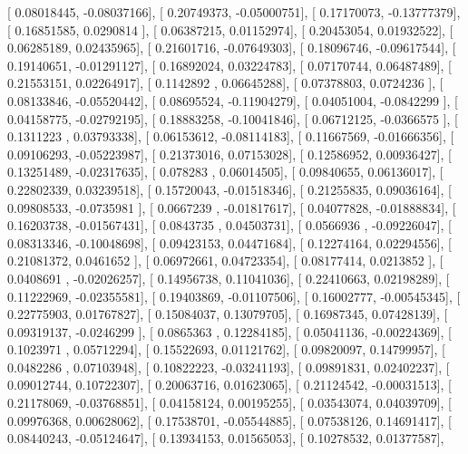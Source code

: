 \documentclass{article}
\begin{document}
       [ 0.08018445, -0.08037166],
       [ 0.20749373, -0.05000751],
       [ 0.17170073, -0.13777379],
       [ 0.16851585,  0.0290814 ],
       [ 0.06387215,  0.01152974],
       [ 0.20453054,  0.01932522],
       [ 0.06285189,  0.02435965],
       [ 0.21601716, -0.07649303],
       [ 0.18096746, -0.09617544],
       [ 0.19140651, -0.01291127],
       [ 0.16892024,  0.03224783],
       [ 0.07170744,  0.06487489],
       [ 0.21553151,  0.02264917],
       [ 0.1142892 ,  0.06645288],
       [ 0.07378803,  0.0724236 ],
       [ 0.08133846, -0.05520442],
       [ 0.08695524, -0.11904279],
       [ 0.04051004, -0.0842299 ],
       [ 0.04158775, -0.02792195],
       [ 0.18883258, -0.10041846],
       [ 0.06712125, -0.0366575 ],
       [ 0.1311223 ,  0.03793338],
       [ 0.06153612, -0.08114183],
       [ 0.11667569, -0.01666356],
       [ 0.09106293, -0.05223987],
       [ 0.21373016,  0.07153028],
       [ 0.12586952,  0.00936427],
       [ 0.13251489, -0.02317635],
       [ 0.078283  ,  0.06014505],
       [ 0.09840655,  0.06136017],
       [ 0.22802339,  0.03239518],
       [ 0.15720043, -0.01518346],
       [ 0.21255835,  0.09036164],
       [ 0.09808533, -0.0735981 ],
       [ 0.0667239 , -0.01817617],
       [ 0.04077828, -0.01888834],
       [ 0.16203738, -0.01567431],
       [ 0.0843735 ,  0.04503731],
       [ 0.0566936 , -0.09226047],
       [ 0.08313346, -0.10048698],
       [ 0.09423153,  0.04471684],
       [ 0.12274164,  0.02294556],
       [ 0.21081372,  0.0461652 ],
       [ 0.06972661,  0.04723354],
       [ 0.08177414,  0.0213852 ],
       [ 0.0408691 , -0.02026257],
       [ 0.14956738,  0.11041036],
       [ 0.22410663,  0.02198289],
       [ 0.11222969, -0.02355581],
       [ 0.19403869, -0.01107506],
       [ 0.16002777, -0.00545345],
       [ 0.22775903,  0.01767827],
       [ 0.15084037,  0.13079705],
       [ 0.16987345,  0.07428139],
       [ 0.09319137, -0.0246299 ],
       [ 0.0865363 ,  0.12284185],
       [ 0.05041136, -0.00224369],
       [ 0.1023971 ,  0.05712294],
       [ 0.15522693,  0.01121762],
       [ 0.09820097,  0.14799957],
       [ 0.0482286 ,  0.07103948],
       [ 0.10822223, -0.03241193],
       [ 0.09891831,  0.02402237],
       [ 0.09012744,  0.10722307],
       [ 0.20063716,  0.01623065],
       [ 0.21124542, -0.00031513],
       [ 0.21178069, -0.03768851],
       [ 0.04158124,  0.00195255],
       [ 0.03543074,  0.04039709],
       [ 0.09976368,  0.00628062],
       [ 0.17538701, -0.05544885],
       [ 0.07538126,  0.14691417],
       [ 0.08440243, -0.05124647],
       [ 0.13934153,  0.01565053],
       [ 0.10278532,  0.01377587],
\end{document}
